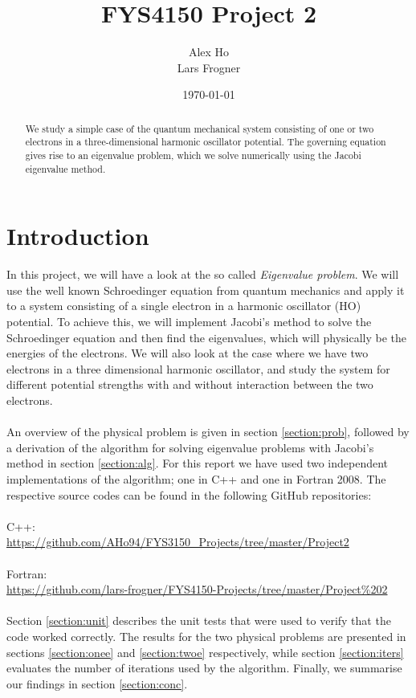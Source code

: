 \documentclass{article}
\begin{document}
\title{\bfseries FYS4150 Project 2}
\author{Alex Ho\\Lars Frogner}
\date{\today}
\maketitle

\begin{abstract}
	We study a simple case of the quantum mechanical system consisting of one or two electrons in a three-dimensional harmonic oscillator potential. The governing equation gives rise to an eigenvalue problem, which we solve numerically using the Jacobi eigenvalue method. 
\end{abstract}

\tableofcontents
\newpage
{}

\section{Introduction}
In this project, we will have a look at the so called \textit{Eigenvalue problem}. We will use the well known Schroedinger equation from quantum mechanics and apply it to a system consisting of a single electron in a harmonic oscillator (HO) potential. To achieve this, we will implement Jacobi's method to solve the Schroedinger equation and then find the eigenvalues, which will physically be the energies of the electrons. We will also look at the case where we have two electrons in a three dimensional harmonic oscillator, and study the system for different potential strengths with and without interaction between the two electrons.\\\\
An overview of the physical problem is given in section \ref{section:prob}, followed by a derivation of the algorithm for solving eigenvalue problems with Jacobi's method in section \ref{section:alg}. For this report we have used two independent implementations of the algorithm; one in C++ and one in Fortran 2008. The respective source codes can be found in the following GitHub repositories:\\\\
C++:\\\url{https://github.com/AHo94/FYS3150_Projects/tree/master/Project2}\\\\
Fortran:\\\url{https://github.com/lars-frogner/FYS4150-Projects/tree/master/Project%202}\\\\
Section \ref{section:unit} describes the unit tests that were used to verify that the code worked correctly. The results for the two physical problems are presented in sections \ref{section:onee} and \ref{section:twoe} respectively, while section \ref{section:iters} evaluates the number of iterations used by the algorithm. Finally, we summarise our findings in section \ref{section:conc}.
\end{document}
